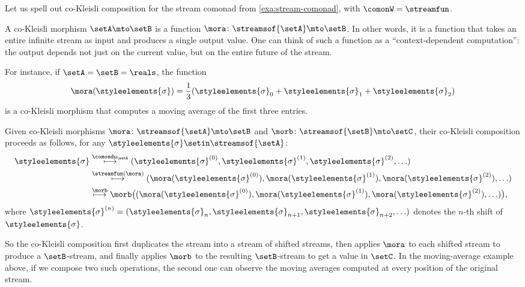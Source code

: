 \begin{example}
\label{exa:cokleisli-stream}
Let us spell out co-Kleisli composition for the stream comonad from \cref{exa:stream-comonad}, with $\comonW = \streamfun$.

A co-Kleisli morphism $\setA \mto \setB$ is a function $\mora \colon \streamsof{\setA} \mto \setB$. In other words, it is a function that takes an entire infinite stream as input and produces a single output value. One can think of such a function as a ``context-dependent computation'': the output depends not just on the current value, but on the entire future of the stream.

For instance, if $\setA = \setB = \reals$, the function
\begin{equation*}
    \mora(\styleelements{\sigma}) = \frac{1}{3}(\styleelements{\sigma}_0 + \styleelements{\sigma}_1 + \styleelements{\sigma}_2)
\end{equation*}
is a co-Kleisli morphism that computes a moving average of the first three entries.

Given co-Kleisli morphisms $\mora \colon \streamsof{\setA} \mto \setB$ and $\morb \colon \streamsof{\setB} \mto \setC$, their co-Kleisli composition proceeds as follows, for any $\styleelements{\sigma} \setin \streamsof{\setA}$:
\begin{equation*}
\begin{split}
\styleelements{\sigma} & \overset{\comondu_\setA}{\longmapsto} (\styleelements{\sigma}^{(0)}, \styleelements{\sigma}^{(1)}, \styleelements{\sigma}^{(2)}, \ldots) \\
& \overset{\streamfun(\mora)}{\longmapsto} (\mora(\styleelements{\sigma}^{(0)}), \mora(\styleelements{\sigma}^{(1)}), \mora(\styleelements{\sigma}^{(2)}), \ldots) \\
& \overset{\morb}{\longmapsto} \morb\bigl((\mora(\styleelements{\sigma}^{(0)}), \mora(\styleelements{\sigma}^{(1)}), \mora(\styleelements{\sigma}^{(2)}), \ldots)\bigr),
\end{split}
\end{equation*}
where $\styleelements{\sigma}^{(n)} = (\styleelements{\sigma}_n, \styleelements{\sigma}_{n+1}, \styleelements{\sigma}_{n+2}, \ldots)$ denotes the $n$-th shift of $\styleelements{\sigma}$.

So the co-Kleisli composition first duplicates the stream into a stream of shifted streams, then applies $\mora$ to each shifted stream to produce a $\setB$-stream, and finally applies $\morb$ to the resulting $\setB$-stream to get a value in $\setC$. In the moving-average example above, if we compose two such operations, the second one can observe the moving averages computed at every position of the original stream.
\end{example}


